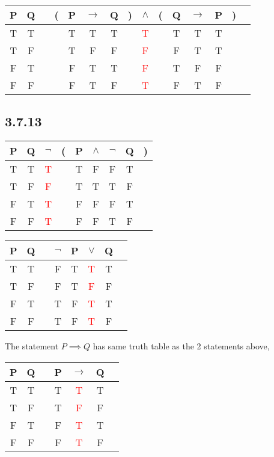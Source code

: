 \documentclass{article}
\begin{document}
\begin{tabular}{@{ }c@{ }@{ }c | c@{ }@{}c@{}@{ }c@{ }@{ }c@{ }@{ }c@{ }@{}c@{}@{ }c@{ }@{}c@{}@{ }c@{ }@{ }c@{ }@{ }c@{ }@{}c@{}@{ }c}
P & Q &  & ( & P & $\rightarrow$ & Q & ) & $\land$ & ( & Q & $\rightarrow$ & P & ) & \\
\hline 
T & T &  &  & T & T & T &  & \textcolor{red}{T} &  & T & T & T &  & \\
T & F &  &  & T & F & F &  & \textcolor{red}{F} &  & F & T & T &  & \\
F & T &  &  & F & T & T &  & \textcolor{red}{F} &  & T & F & F &  & \\
F & F &  &  & F & T & F &  & \textcolor{red}{T} &  & F & T & F &  & \\
\end{tabular}

\subsection*{3.7.13}

\begin{tabular}{@{ }c@{ }@{ }c | c@{ }@{}c@{}@{ }c@{ }@{ }c@{ }@{ }c@{ }@{ }c@{ }@{}c@{ }}
P & Q & $\lnot$ & ( & P & $\land$ & $\lnot$ & Q & )\\
\hline 
T & T & \textcolor{red}{T} &  & T & F & F & T & \\
T & F & \textcolor{red}{F} &  & T & T & T & F & \\
F & T & \textcolor{red}{T} &  & F & F & F & T & \\
F & F & \textcolor{red}{T} &  & F & F & T & F & \\
\end{tabular}

\begin{tabular}{@{ }c@{ }@{ }c | c@{ }@{ }c@{ }@{ }c@{ }@{ }c@{ }@{ }c@{ }@{ }c}
P & Q &  & $\lnot$ & P & $\lor$ & Q & \\
\hline 
T & T &  & F & T & \textcolor{red}{T} & T & \\
T & F &  & F & T & \textcolor{red}{F} & F & \\
F & T &  & T & F & \textcolor{red}{T} & T & \\
F & F &  & T & F & \textcolor{red}{T} & F & \\
\end{tabular}

The statement $P\implies Q$ has same truth table as the 2 statements above,

\begin{tabular}{@{ }c@{ }@{ }c | c@{ }@{ }c@{ }@{ }c@{ }@{ }c@{ }@{ }c}
P & Q &  & P & $\rightarrow$ & Q & \\
\hline 
T & T &  & T & \textcolor{red}{T} & T & \\
T & F &  & T & \textcolor{red}{F} & F & \\
F & T &  & F & \textcolor{red}{T} & T & \\
F & F &  & F & \textcolor{red}{T} & F & \\
\end{tabular}
\end{document}
